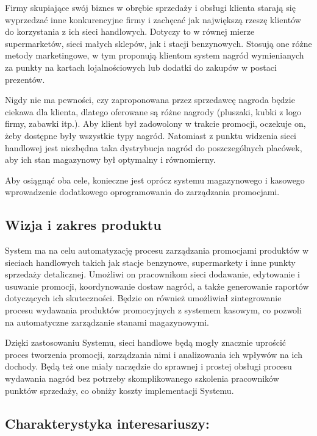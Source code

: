 \documentclass[a4paper,12pt]{article}
\begin{document}
Firmy skupiające swój biznes w obrębie sprzedaży i obsługi klienta starają się wyprzedzać inne konkurencyjne firmy i zachęcać jak największą rzeszę klientów do korzystania z ich sieci handlowych.
Dotyczy to w równej mierze supermarketów, sieci małych sklepów, jak i stacji benzynowych.
Stosują one różne metody marketingowe, w tym proponują klientom system nagród wymienianych za punkty na kartach lojalnościowych lub dodatki do zakupów w postaci prezentów.

Nigdy nie ma pewności, czy zaproponowana przez sprzedawcę nagroda będzie ciekawa dla klienta, dlatego oferowane są różne nagrody (pluszaki, kubki z logo firmy, zabawki itp.).
Aby klient był zadowolony w trakcie promocji, oczekuje on, żeby dostępne były wszystkie typy nagród.
Natomiast z punktu widzenia sieci handlowej jest niezbędna taka dystrybucja nagród do poszczególnych placówek, aby ich stan magazynowy był optymalny i równomierny.

Aby osiągnąć oba cele, konieczne jest oprócz systemu magazynowego i kasowego wprowadzenie dodatkowego oprogramowania do zarządzania promocjami.

\subsection{Wizja i zakres produktu}

System ma na celu automatyzację procesu zarządzania promocjami produktów w sieciach handlowych takich jak stacje benzynowe, supermarkety i inne punkty sprzedaży detalicznej.
Umożliwi on pracownikom sieci dodawanie, edytowanie i usuwanie promocji, koordynowanie dostaw nagród, a także generowanie raportów dotyczących ich skuteczności.
Będzie on również umożliwiał zintegrowanie procesu wydawania produktów promocyjnych z systemem kasowym, co pozwoli na automatyczne zarządzanie stanami magazynowymi.

Dzięki zastosowaniu Systemu, sieci handlowe będą mogły znacznie uprościć proces tworzenia promocji, zarządzania nimi i analizowania ich wpływów na ich dochody.
Będą też one miały narzędzie do sprawnej i prostej obsługi procesu wydawania nagród bez potrzeby skomplikowanego szkolenia pracowników punktów sprzedaży, co obniży koszty implementacji Systemu.

\subsection{Charakterystyka interesariuszy:}
\end{document}

